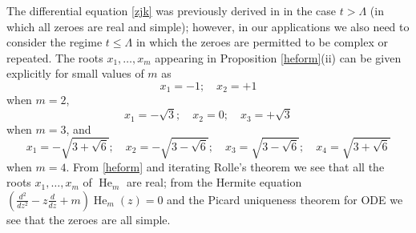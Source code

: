 \documentclass[a4paper,11pt,twoside]{amsart}
\begin{document}
The differential equation \eqref{zjk} was previously derived in \cite[Lemma 2.4]{csv} in the case $t > \Lambda$ (in which all zeroes are real and simple); however, in our applications we also need to consider the regime $t \leq \Lambda$ in which the zeroes are permitted to be complex or repeated.
The roots $x_1,\dots,x_m$ appearing in Proposition \ref{heform}(ii) can be given explicitly for small values of $m$ as
$$ x_1 = -1; \quad x_2 = +1$$
when $m=2$,
$$ x_1 = -\sqrt{3}; \quad x_2 = 0; \quad x_3 = +\sqrt{3}$$
when $m=3$, and
$$ x_1 = -\sqrt{3+\sqrt{6}}; \quad x_2 = -\sqrt{3-\sqrt{6}}; \quad x_3 = \sqrt{3 - \sqrt{6}}; \quad  x_4 = \sqrt{3 + \sqrt{6}}$$
when $m=4$.  From \eqref{heform} and iterating Rolle's theorem we see that all the roots $x_1,\dots,x_m$ of $\operatorname{He}_m$ are real; from the Hermite equation $\left(\frac{d^2}{dz^2} - z \frac{d}{dz} + m\right) \operatorname{He}_m(z) = 0$ and the Picard uniqueness theorem for ODE we see that the zeroes are all simple.
\end{document}
